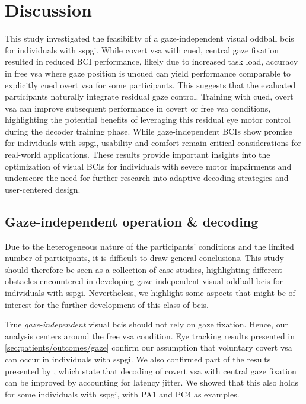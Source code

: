 \documentclass[twocolumn]{article}
\begin{document}
\section{Discussion}

This study investigated the feasibility of a gaze-independent visual oddball
\acp{bci} for individuals with \ac{sspgi}.
While covert \ac{vsa} with cued, central gaze fixation resulted in reduced BCI
performance, likely due to increased task load, accuracy in free \ac{vsa} where gaze position is uncued can
yield performance comparable to explicitly cued overt \ac{vsa} for some
participants.
This suggests that the evaluated participants naturally integrate residual gaze control.
Training with cued, overt \ac{vsa} can improve subsequent performance in covert
or free \ac{vsa} conditions,
highlighting the potential benefits of leveraging this residual eye motor control
during the decoder training phase.
While gaze-independent BCIs show promise for individuals with \ac{sspgi},
usability and comfort remain critical considerations for real-world applications.
These results provide important insights into the optimization of visual BCIs for individuals with severe motor impairments and underscore the need for further research into adaptive decoding strategies and user-centered design.

\subsection{Gaze-independent operation \& decoding}
Due to the heterogeneous nature of the participants' conditions and the limited
number of participants, it is difficult to draw general conclusions.
This study should therefore be seen as a collection of case studies,
highlighting different obstacles encountered in developing gaze-independent
visual oddball \acp{bci} for individuals with \ac{sspgi}.
Nevertheless, we highlight some aspects that might be
of interest for the further development of this class of \acp{bci}.

True \emph{gaze-independent} visual \acp{bci} should not rely on gaze fixation.
Hence, our analysis centers around the free \ac{vsa} condition.
Eye tracking results presented in \cref{sec:patients/outcomes/gaze}
confirm our assumption that voluntary covert \ac{vsa} can
occur in individuals with \ac{sspgi}.
We also confirmed part of the results presented by \textcite{VanDenKerchove2024},
which state that decoding of covert \ac{vsa} with central gaze
fixation can be improved by accounting for latency jitter. We showed that this
also holds for some individuals with \ac{sspgi}, with PA1 and PC4 as examples.
\end{document}
